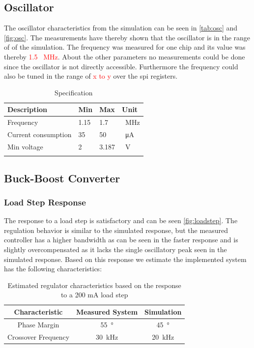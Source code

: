 \subsection{Oscillator}
The oscillator characteristics from the simulation can be seen in \autoref{tab:osc} and \autoref{fig:osc}. The measurements have thereby shown that the oscillator is in the range of of the simulation. The frequency was measured for one chip and its value was thereby \textcolor{red}{1.5 \qty{}{\mega\hertz}}. About the other parameters no measurements could be done since the oscillator is not directly accessible. Furthermore the frequency could also be tuned in the range of \textcolor{red}{x to y} over the spi registers. 
\begin{longtable}{|p{3.5cm}|p{3.5cm}|p{3.5cm}|p{3.5cm}|}
	\hline
	\rowcolor{lightgray}
	\textbf{Description} &\textbf{Min} &\textbf{Max} & \textbf{Unit} \\ \hline
	
	Frequency & 1.15 & 1.7 &\qty{}{\mega\hertz} \\ \hline
	Current consumption & 35 & 50 & \qty{}{\micro\ampere} \\ \hline
	Min voltage & 2& 3.187 & \qty{}{\volt} \\ \hline
	\caption{Specification} %
	\label{tab:osc}
\end{longtable}

\clearpage

\subsection{Buck-Boost Converter}
\subsubsection{Load Step Response}
The response to a load step is satisfactory and can be seen \autoref{fig:loadstep}. The regulation behavior is similar to the simulated response, but the measured controller has a higher bandwidth as can be seen in the faster response and is slightly overcompensated as it lacks the single oscillatory peak seen in the simulated response. Based on this response we estimate the implemented system has the following characteristics:

\begin{table}[H]
    \centering
    \begin{tabular}{|c|c|c|}
        Characteristic & Measured System & Simulation \\
        \hline
         Phase Margin  & \qty{55}{\degree} & \qty{45}{\degree}\\
		 Crossover Frequency & \qty{30}{\kilo\hertz} & \qty{20}{\kilo\hertz}  \\
    \end{tabular}
    \caption{Estimated regulator characteristics based on the response to a 200 mA load step}
    \label{tab:regChar}
\end{table}

